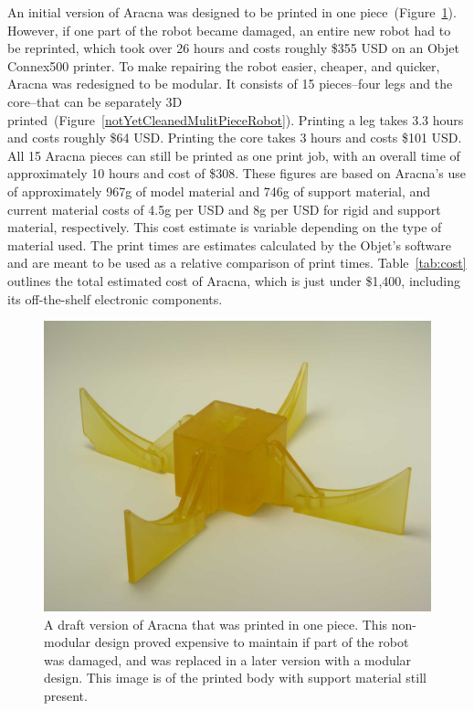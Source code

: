 \documentclass[letterpaper]{article}
\begin{document}
An initial version of Aracna was designed to be printed in one piece~(Figure~\ref{notYetCleanedOnePieceRobot}). However, if one part of the robot became damaged, an entire new robot had to be reprinted, which took over 26 hours and costs roughly \$355 USD on an Objet Connex500 printer. To make repairing the robot easier, cheaper, and quicker, Aracna was redesigned to be modular. It consists of 15 pieces--four legs and the core--that can be separately 3D printed~(Figure~\ref{notYetCleanedMulitPieceRobot}). Printing a leg takes 3.3 hours and costs roughly \$64 USD. Printing the core takes 3 hours and costs \$101 USD. All 15 Aracna pieces can still be printed as one print job, with an overall time of approximately 10 hours and cost of \$308. These figures are based on Aracna's use of  approximately 967g of model material and 746g of support material, and current material costs of 4.5g per USD and 8g per USD for rigid and support material, respectively. This cost estimate is variable depending on the type of material used. The print times are estimates calculated by the Objet's software and are meant to be used as a relative comparison of print times. Table~\ref{tab:cost} outlines the total estimated cost of Aracna, which is just under \$1,400, including its off-the-shelf electronic components. 


\begin{figure}[t]
\begin{center}
\includegraphics[width=.37\textwidth]{fig2.jpg}
\caption{A draft version of Aracna that was printed in one piece. This non-modular design proved expensive to maintain if part of the robot was damaged, and was replaced in a later version with a modular design. This image is of the printed body with support material still present.}
\label{notYetCleanedOnePieceRobot}
\end{center}
\end{figure}
\end{document}
